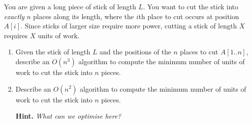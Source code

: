 \documentclass{article}
\begin{document}
\begin{question}
You are given a long piece of stick of length $L$. You want to cut the stick into {\em exactly} $n$ places along its length, where the $i$th place to cut occurs at position $A[i]$. Since sticks of larger size require more power, cutting a stick of length $X$ requires $X$ units of work.

\begin{enumerate}[label = (\alph*)]
    \item Given the stick of length $L$ and the positions of the $n$ places to cut $A[1..n]$, describe an $O(n^3)$ algorithm to compute the minimum number of units of work to cut the stick into $n$ pieces.

    \item Describe an $O(n^2)$ algorithm to compute the minimum number of units of work to cut the stick into $n$ pieces.

    {\bfseries Hint.} {\em What can we optimise here?}
\end{enumerate}
\end{question}
\end{document}
